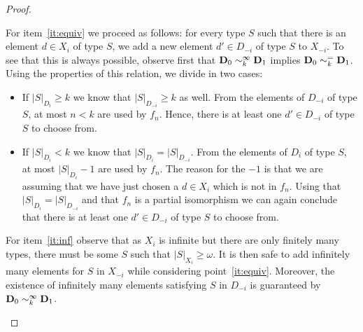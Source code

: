 \begin{proof}
\begin{pfclaim}

		For item~\eqref{it:equiv} we proceed as follows: for every type $S$ such that there is an element $d\in X_i$ of type $S$, we add a new element $d'\in D_{-i}$ of type $S$ to $X_{-i}$. To see that this is always possible, observe first that $\mathbf{D}_0 \sim_k^\infty \mathbf{D}_1$ implies $\mathbf{D}_0 \sim_k^= \mathbf{D}_1$. Using the properties of this relation, we divide in two cases:
		\begin{itemize}
			\item If $|S|_{D_i} \geq k$ we know that $|S|_{D_{-i}} \geq k$ as well. From the elements of $D_{-i}$ of type $S$, at most $n<k$ are used by $f_n$. Hence, there is at least one $d'\in D_{-i}$ of type $S$ to choose from.
			\item If $|S|_{D_i} < k$ we know that $|S|_{D_{i}} = |S|_{D_{-i}}$. From the elements of $D_{i}$ of type $S$, at most $|S|_{D_{i}}-1$ are used by $f_n$. The reason for the $-1$ is that we are assuming that we have just chosen a $d\in X_i$ which is not in $f_n$. Using that $|S|_{D_{i}} = |S|_{D_{-i}}$ and that $f_n$ is a partial isomorphism we can again conclude that there is at least one $d'\in D_{-i}$ of type $S$ to choose from.
		\end{itemize}
		For item~\eqref{it:inf} observe that as $X_{i}$ is infinite but there are only finitely many types, there must be some $S$ such that $|S|_{X_i} \geq \omega$. It is then safe to add infinitely many elements for $S$ in $X_{-i}$ while considering point~\eqref{it:equiv}. Moreover, the existence of infinitely many elements satisfying $S$ in $D_{-i}$ is guaranteed by $\mathbf{D}_0 \sim_k^\infty \mathbf{D}_1$.


\end{pfclaim}
\end{proof}
